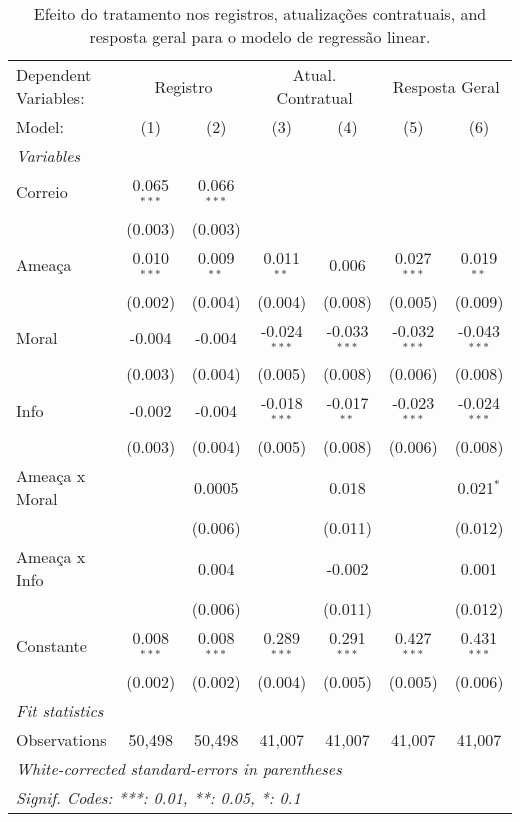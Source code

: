 \begin{table}[htbp]\centering
\caption{\label{tab:tab2} Efeito do tratamento nos registros, atualizações contratuais, and resposta geral para o modelo de regressão linear.}
\begin{tabular}{lcccccc}
\tabularnewline\toprule\toprule
Dependent Variables:&\multicolumn{2}{c}{Registro}&\multicolumn{2}{c}{Atual. Contratual}&\multicolumn{2}{c}{Resposta Geral}\\
Model:&(1) & (2) & (3) & (4) & (5) & (6)\\
\midrule
\emph{Variables}&  & & & & & \\
Correio&0.065$^{***}$&0.066$^{***}$&  &  &  &  \\
  &(0.003)&(0.003)&  &  &  &  \\
Ameaça&0.010$^{***}$&0.009$^{**}$&0.011$^{**}$&0.006&0.027$^{***}$&0.019$^{**}$\\
  &(0.002)&(0.004)&(0.004)&(0.008)&(0.005)&(0.009)\\
Moral&-0.004&-0.004&-0.024$^{***}$&-0.033$^{***}$&-0.032$^{***}$&-0.043$^{***}$\\
  &(0.003)&(0.004)&(0.005)&(0.008)&(0.006)&(0.008)\\
Info&-0.002&-0.004&-0.018$^{***}$&-0.017$^{**}$&-0.023$^{***}$&-0.024$^{***}$\\
  &(0.003)&(0.004)&(0.005)&(0.008)&(0.006)&(0.008)\\
Ameaça x Moral&  &0.0005&  &0.018&  &0.021$^{*}$\\
  &  &(0.006)&  &(0.011)&  &(0.012)\\
Ameaça x Info&  &0.004&  &-0.002&  &0.001\\
  &  &(0.006)&  &(0.011)&  &(0.012)\\
Constante&0.008$^{***}$&0.008$^{***}$&0.289$^{***}$&0.291$^{***}$&0.427$^{***}$&0.431$^{***}$\\
  &(0.002)&(0.002)&(0.004)&(0.005)&(0.005)&(0.006)\\
\midrule
\emph{Fit statistics}&  & & & & & \\
Observations& 50,498&50,498&41,007&41,007&41,007&41,007\\
\bottomrule\bottomrule
\multicolumn{7}{l}{\emph{White-corrected standard-errors in parentheses}}\\
\multicolumn{7}{l}{\emph{Signif. Codes: ***: 0.01, **: 0.05, *: 0.1}}\\
\end{tabular}
\end{table}